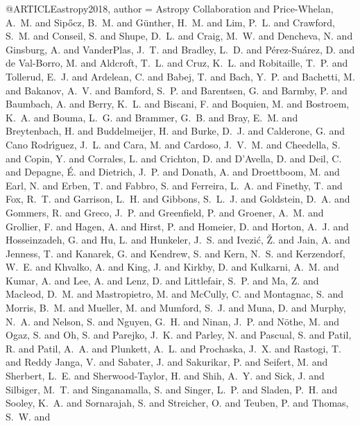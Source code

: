 @ARTICLE{astropy2018,
   author = {{Astropy Collaboration} and {Price-Whelan}, A.~M. and {Sip{\H o}cz}, B.~M. and
	{G{\"u}nther}, H.~M. and {Lim}, P.~L. and {Crawford}, S.~M. and
	{Conseil}, S. and {Shupe}, D.~L. and {Craig}, M.~W. and {Dencheva}, N. and
	{Ginsburg}, A. and {VanderPlas}, J.~T. and {Bradley}, L.~D. and
	{P{\'e}rez-Su{\'a}rez}, D. and {de Val-Borro}, M. and {Aldcroft}, T.~L. and
	{Cruz}, K.~L. and {Robitaille}, T.~P. and {Tollerud}, E.~J. and
	{Ardelean}, C. and {Babej}, T. and {Bach}, Y.~P. and {Bachetti}, M. and
	{Bakanov}, A.~V. and {Bamford}, S.~P. and {Barentsen}, G. and
	{Barmby}, P. and {Baumbach}, A. and {Berry}, K.~L. and {Biscani}, F. and
	{Boquien}, M. and {Bostroem}, K.~A. and {Bouma}, L.~G. and {Brammer}, G.~B. and
	{Bray}, E.~M. and {Breytenbach}, H. and {Buddelmeijer}, H. and
	{Burke}, D.~J. and {Calderone}, G. and {Cano Rodr{\'{\i}}guez}, J.~L. and
	{Cara}, M. and {Cardoso}, J.~V.~M. and {Cheedella}, S. and {Copin}, Y. and
	{Corrales}, L. and {Crichton}, D. and {D'Avella}, D. and {Deil}, C. and
	{Depagne}, {\'E}. and {Dietrich}, J.~P. and {Donath}, A. and
	{Droettboom}, M. and {Earl}, N. and {Erben}, T. and {Fabbro}, S. and
	{Ferreira}, L.~A. and {Finethy}, T. and {Fox}, R.~T. and {Garrison}, L.~H. and
	{Gibbons}, S.~L.~J. and {Goldstein}, D.~A. and {Gommers}, R. and
	{Greco}, J.~P. and {Greenfield}, P. and {Groener}, A.~M. and
	{Grollier}, F. and {Hagen}, A. and {Hirst}, P. and {Homeier}, D. and
	{Horton}, A.~J. and {Hosseinzadeh}, G. and {Hu}, L. and {Hunkeler}, J.~S. and
	{Ivezi{\'c}}, {\v Z}. and {Jain}, A. and {Jenness}, T. and {Kanarek}, G. and
	{Kendrew}, S. and {Kern}, N.~S. and {Kerzendorf}, W.~E. and
	{Khvalko}, A. and {King}, J. and {Kirkby}, D. and {Kulkarni}, A.~M. and
	{Kumar}, A. and {Lee}, A. and {Lenz}, D. and {Littlefair}, S.~P. and
	{Ma}, Z. and {Macleod}, D.~M. and {Mastropietro}, M. and {McCully}, C. and
	{Montagnac}, S. and {Morris}, B.~M. and {Mueller}, M. and {Mumford}, S.~J. and
	{Muna}, D. and {Murphy}, N.~A. and {Nelson}, S. and {Nguyen}, G.~H. and
	{Ninan}, J.~P. and {N{\"o}the}, M. and {Ogaz}, S. and {Oh}, S. and
	{Parejko}, J.~K. and {Parley}, N. and {Pascual}, S. and {Patil}, R. and
	{Patil}, A.~A. and {Plunkett}, A.~L. and {Prochaska}, J.~X. and
	{Rastogi}, T. and {Reddy Janga}, V. and {Sabater}, J. and {Sakurikar}, P. and
	{Seifert}, M. and {Sherbert}, L.~E. and {Sherwood-Taylor}, H. and
	{Shih}, A.~Y. and {Sick}, J. and {Silbiger}, M.~T. and {Singanamalla}, S. and
	{Singer}, L.~P. and {Sladen}, P.~H. and {Sooley}, K.~A. and
	{Sornarajah}, S. and {Streicher}, O. and {Teuben}, P. and {Thomas}, S.~W. and
}}
